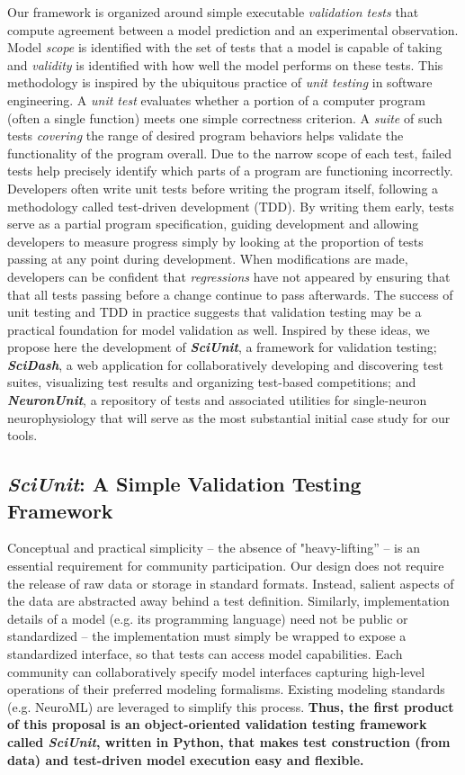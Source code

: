 \documentclass[11pt,letterpaper]{article}
\begin{document}
Our framework is organized around simple executable \emph{validation tests} that compute agreement between a model prediction and an experimental observation. Model \textit{scope} is identified with the set of tests that a model is capable of taking and \textit{validity} is identified with how well the model performs on these tests. This methodology is inspired by the ubiquitous practice of \emph{unit testing} in software engineering. A \emph{unit test} evaluates whether a portion of a computer program (often a single function) meets one simple correctness criterion. A \textit{suite} of such tests \emph{covering} the range of desired program behaviors helps validate the functionality of the program overall. Due to the narrow scope of each test, failed tests help precisely identify which parts of a program are functioning incorrectly. Developers often write unit tests before writing the program itself, following a methodology called test-driven development (TDD)\cite{beck2003}. By writing them early, tests serve as a partial program specification, guiding development and allowing developers to measure progress simply by looking at the proportion of tests passing at any point during development. When modifications are made, developers can be confident that \emph{regressions} have not appeared by ensuring that that all tests passing before a change continue to pass afterwards. The success of unit testing and TDD in practice suggests that validation testing may be a practical foundation for model validation as well.  Inspired by these ideas, we propose here the development of \textbf{\textit{SciUnit}}, a framework for validation testing; \textbf{\textit{SciDash}}, a web application for collaboratively developing and discovering test suites, visualizing test results and organizing test-based competitions; and \textbf{\textit{NeuronUnit}}, a repository of tests and associated utilities for single-neuron neurophysiology that will serve as the most substantial initial case study for our tools.

\subsection{\textit{SciUnit}: A Simple Validation Testing Framework}
Conceptual and practical simplicity -- the absence of "heavy-lifting'' -- is an essential requirement for community participation. Our design does not require the release of raw data or storage in standard formats. Instead, salient aspects of the data are abstracted away behind a test definition. Similarly, implementation details of a model (e.g. its programming language) need not be public or standardized -- the implementation must simply be wrapped to expose a standardized interface, so that tests can access model capabilities. Each community can collaboratively specify model interfaces capturing high-level operations of their preferred modeling formalisms. Existing modeling standards (e.g. NeuroML\cite{neuroml_url,gleeson_neuroml:_2010}) are leveraged to simplify this process. \textbf{Thus, the first product of this proposal is an object-oriented validation testing framework called \textit{SciUnit}, written in Python, that makes test construction (from data) and test-driven model execution easy and flexible.} 
\end{document}
